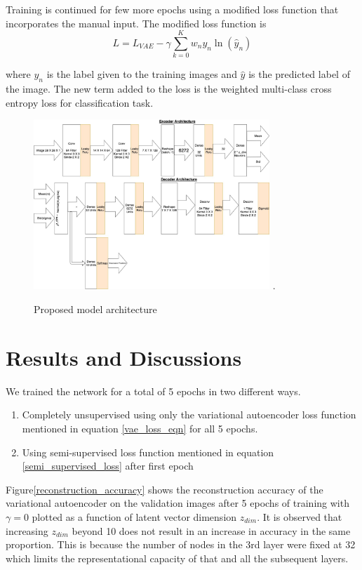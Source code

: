 \documentclass{uai2021} %
\begin{document}
Training is continued for  few more epochs using a modified loss function that incorporates the manual input.
The modified loss function is
\begin{equation} \label{semi_supervised_loss}
L = L_{VAE}  - \gamma \sum_{k=0}^{K}w_{n}y_{n}\ln(\hat{y}_{n})
\end{equation}

where $y_n$ is the label given to the training images and $\hat{y}$ is the predicted label of the image.
The new term added to the loss is the weighted multi-class cross entropy loss for classification task.

\begin{figure}[!t]
\centering
\includegraphics[width=3.5in]{vae_model_architecture_classification.jpg}
\DeclareGraphicsExtensions.
\caption{Proposed model architecture}
\label{vae_architecture}
\end{figure}

\section{Results and Discussions} \label{results}

We trained the network for a total of 5 epochs in two different ways.
\begin{enumerate}
    \item Completely unsupervised using only the variational autoencoder loss function mentioned in equation \ref{vae_loss_eqn} for all 5 epochs.
    \item Using semi-supervised loss function mentioned in equation \ref{semi_supervised_loss} after first epoch
\end{enumerate}


Figure\ref{reconstruction_accuracy} shows  the reconstruction accuracy of the variational autoencoder on the validation images after 5 epochs of training with $\gamma = 0$  plotted as a function of latent vector dimension $z_{dim}$.
It is observed that increasing $z_{dim}$ beyond 10 does not result in an increase in accuracy in the same proportion.
This is because the number of nodes in the 3rd layer were fixed at 32 which limits the representational capacity of that and all the subsequent layers.
\end{document}
